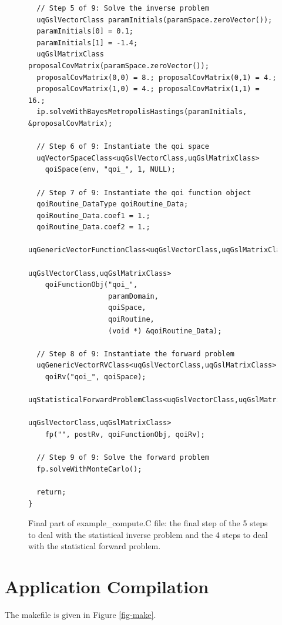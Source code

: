 \begin{figure}[h!]
\begin{center}
\begin{verbatim}
  // Step 5 of 9: Solve the inverse problem
  uqGslVectorClass paramInitials(paramSpace.zeroVector());
  paramInitials[0] = 0.1;
  paramInitials[1] = -1.4;
  uqGslMatrixClass proposalCovMatrix(paramSpace.zeroVector());
  proposalCovMatrix(0,0) = 8.; proposalCovMatrix(0,1) = 4.;
  proposalCovMatrix(1,0) = 4.; proposalCovMatrix(1,1) = 16.;
  ip.solveWithBayesMetropolisHastings(paramInitials, &proposalCovMatrix);

  // Step 6 of 9: Instantiate the qoi space
  uqVectorSpaceClass<uqGslVectorClass,uqGslMatrixClass>
    qoiSpace(env, "qoi_", 1, NULL);

  // Step 7 of 9: Instantiate the qoi function object
  qoiRoutine_DataType qoiRoutine_Data;
  qoiRoutine_Data.coef1 = 1.;
  qoiRoutine_Data.coef2 = 1.;
  uqGenericVectorFunctionClass<uqGslVectorClass,uqGslMatrixClass,
                               uqGslVectorClass,uqGslMatrixClass>
    qoiFunctionObj("qoi_",
                   paramDomain,
                   qoiSpace,
                   qoiRoutine,
                   (void *) &qoiRoutine_Data);

  // Step 8 of 9: Instantiate the forward problem
  uqGenericVectorRVClass<uqGslVectorClass,uqGslMatrixClass>
    qoiRv("qoi_", qoiSpace);
  uqStatisticalForwardProblemClass<uqGslVectorClass,uqGslMatrixClass,
                                   uqGslVectorClass,uqGslMatrixClass>
    fp("", postRv, qoiFunctionObj, qoiRv);

  // Step 9 of 9: Solve the forward problem
  fp.solveWithMonteCarlo();

  return;
}
\end{verbatim}
\end{center}
\caption{
Final part of example\_compute.C file: the final step of the 5 steps to deal with the statistical inverse problem and the 4 steps to deal with the statistical forward problem.
}
\label{fig-compute-c2}
\end{figure}

\clearpage
\section{Application Compilation}\label{sc-appl-compilation}

The makefile is given in Figure \ref{fig-make}.

